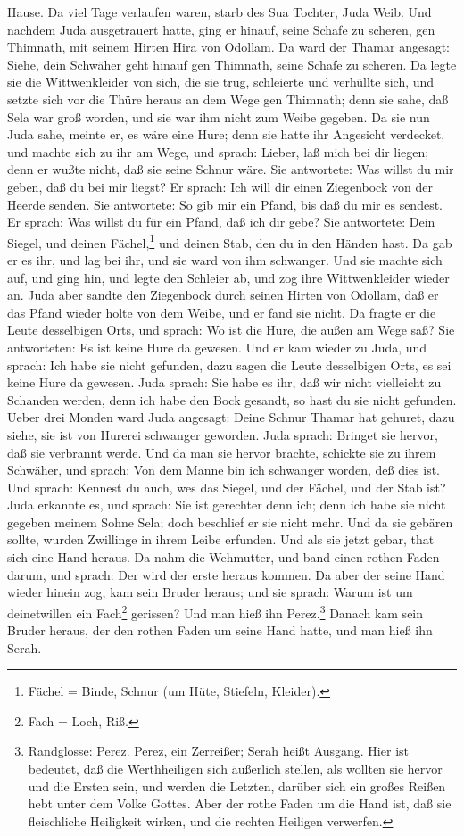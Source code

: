 Hause. Da viel Tage verlaufen waren, starb des Sua Tochter, Juda Weib. Und nachdem Juda ausgetrauert hatte, ging er hinauf, seine Schafe zu scheren, gen Thimnath, mit seinem Hirten Hira von Odollam. Da ward der Thamar angesagt: Siehe, dein Schwäher geht hinauf gen Thimnath, seine Schafe zu scheren. Da legte sie die Wittwenkleider von sich, die sie trug, schleierte und verhüllte sich, und setzte sich vor die Thüre heraus an dem Wege gen Thimnath; denn sie sahe, daß Sela war groß worden, und sie war ihm nicht zum Weibe gegeben. Da sie nun Juda sahe, meinte er, es wäre eine Hure; denn sie hatte ihr Angesicht verdecket, und machte sich zu ihr am Wege, und sprach: Lieber, laß mich bei dir liegen; denn er wußte nicht, daß sie seine Schnur wäre. Sie antwortete: Was willst du mir geben, daß du bei mir liegst? Er sprach: Ich will dir einen Ziegenbock von der Heerde senden. Sie antwortete: So gib mir ein Pfand, bis daß du mir es sendest. Er sprach: Was willst du für ein Pfand, daß ich dir gebe? Sie antwortete: Dein Siegel, und deinen Fächel,\footnote{Fächel = Binde, Schnur (um Hüte, Stiefeln, Kleider).} und deinen Stab, den du in den Händen hast. Da gab er es ihr, und lag bei ihr, und sie ward von ihm schwanger. Und sie machte sich auf, und ging hin, und legte den Schleier ab, und zog ihre Wittwenkleider wieder an. Juda aber sandte den Ziegenbock durch seinen Hirten von Odollam, daß er das Pfand wieder holte von dem Weibe, und er fand sie nicht. Da fragte er die Leute desselbigen Orts, und sprach: Wo ist die Hure, die außen am Wege saß? Sie antworteten: Es ist keine Hure da gewesen. Und er kam wieder zu Juda, und sprach: Ich habe sie nicht gefunden, dazu sagen die Leute desselbigen Orts, es sei keine Hure da gewesen. Juda sprach: Sie habe es ihr, daß wir nicht vielleicht zu Schanden werden, denn ich habe den Bock gesandt, so hast du sie nicht gefunden. Ueber drei Monden ward Juda angesagt: Deine Schnur Thamar hat gehuret, dazu siehe, sie ist von Hurerei schwanger geworden. Juda sprach: Bringet sie hervor, daß sie verbrannt werde. Und da man sie hervor brachte, schickte sie zu ihrem Schwäher, und sprach: Von dem Manne bin ich schwanger worden, deß dies ist. Und sprach: Kennest du auch, wes das Siegel, und der Fächel, und der Stab ist? Juda erkannte es, und sprach: Sie ist gerechter denn ich; denn ich habe sie nicht gegeben meinem Sohne Sela; doch beschlief er sie nicht mehr. Und da sie gebären sollte, wurden Zwillinge in ihrem Leibe erfunden. Und als sie jetzt gebar, that sich eine Hand heraus. Da nahm die Wehmutter, und band einen rothen Faden darum, und sprach: Der wird der erste heraus kommen. Da aber der seine Hand wieder hinein zog, kam sein Bruder heraus; und sie sprach: Warum ist um deinetwillen ein Fach\footnote{Fach = Loch, Riß.} gerissen? Und man hieß ihn Perez.\footnote{Randglosse: Perez. Perez, ein Zerreißer; Serah heißt Ausgang. Hier ist bedeutet, daß die Werthheiligen sich äußerlich stellen, als wollten sie hervor und die Ersten sein, und werden die Letzten, darüber sich ein großes Reißen hebt unter dem Volke Gottes. Aber der rothe Faden um die Hand ist, daß sie fleischliche Heiligkeit wirken, und die rechten Heiligen verwerfen.} Danach kam sein Bruder heraus, der den rothen Faden um seine Hand hatte, und man hieß ihn Serah.

